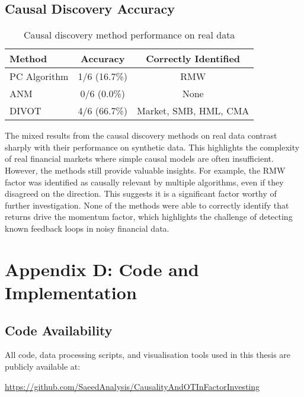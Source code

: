 \section*{Causal Discovery Accuracy}
\begin{table}[H]
    \centering
    \caption{Causal discovery method performance on real data}
    \begin{tabular}{|l|c|c|}
        \hline
        \textbf{Method} & \textbf{Accuracy} & \textbf{Correctly Identified} \\
        \hline
        PC Algorithm & 1/6 (16.7\%) & RMW \\
        ANM   & 0/6 (0.0\%) & None \\
        DIVOT & 4/6 (66.7\%) & Market, SMB, HML, CMA \\
        \hline
    \end{tabular}
\end{table}

\noindent
The mixed results from the causal discovery methods on real data contrast sharply with their performance on synthetic data. This highlights the complexity of real financial markets where simple causal models are often insufficient. However, the methods still provide valuable insights. For example, the RMW factor was identified as causally relevant by multiple algorithms, even if they disagreed on the direction. This suggests it is a significant factor worthy of further investigation. None of the methods were able to correctly identify that returns drive the momentum factor, which highlights the challenge of detecting known feedback loops in noisy financial data.


\chapter{Appendix D: Code and Implementation}
\label{cha: Appendix D}

\section*{Code Availability}
All code, data processing scripts, and visualisation tools used in this thesis are publicly available at:

\begin{center}
\url{https://github.com/SaeedAnalysis/CausalityAndOTInFactorInvesting}
\end{center}

